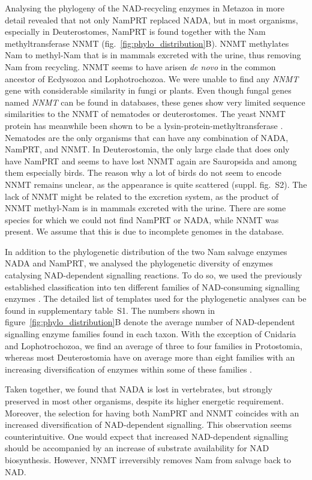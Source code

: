 Analysing the phylogeny of the NAD-recycling enzymes in Metazoa in more detail revealed that not only NamPRT replaced NADA, but in most organisms, especially in Deuterostomes, NamPRT is found together with the Nam methyltransferase NNMT (fig.~\ref{fig:phylo_distribution}B). NNMT methylates Nam to methyl-Nam that is in mammals excreted with the urine, thus removing Nam from recycling. NNMT seems to have arisen \textit{de novo} in the common ancestor of Ecdysozoa and Lophotrochozoa. We were unable to find any \textit{NNMT} gene with considerable similarity in fungi or plants. Even though fungal genes named \textit{NNMT} can be found in databases, these genes show very limited sequence similarities to the NNMT of nematodes or deuterostomes. The yeast NNMT protein has meanwhile been shown to be a lysin-protein-methyltransferase \cite{Wlodarski2011}. Nematodes are the only organisms that can have any combination of NADA, NamPRT, and NNMT. In Deuterostomia, the only large clade that does only have NamPRT and seems to have lost NNMT again are Sauropsida and among them especially birds. The reason why a lot of birds do not seem to encode NNMT remains unclear, as the appearance is quite scattered (suppl. fig.~S2). The lack of NNMT might be related to the excretion system, as the product of NNMT methyl-Nam is in mammals excreted with the urine. There are some species for which we could not find NamPRT or NADA, while NNMT was present. We assume that this is due to incomplete genomes in the database.

In addition to the phylogenetic distribution of the two Nam salvage enzymes NADA and NamPRT, we analysed the phylogenetic diversity of enzymes catalysing NAD-dependent signalling reactions. To do so, we used the previously established classification into ten different families of NAD-consuming signalling enzymes \cite{Gossmann2012FEBS}. The detailed list of templates used for the phylogenetic analyses can be found in supplementary table~S1. The numbers shown in figure~\ref{fig:phylo_distribution}B denote the average number of NAD-dependent signalling enzyme families found in each taxon. With the exception of Cnidaria and Lophotrochozoa, we find an average of three to four families in Protostomia, whereas most Deuterostomia have on average more than eight families with an increasing diversification of enzymes within some of these families \cite{Gossmann2014DNAR}.

Taken together, we found that NADA is lost in vertebrates, but strongly preserved in most other organisms, despite its higher energetic requirement. Moreover, the selection for having both NamPRT and NNMT coincides with an increased diversification of NAD-dependent signalling. This observation seems counterintuitive. One would expect that increased NAD-dependent signalling should be accompanied by an increase of substrate availability for NAD biosynthesis. However, NNMT irreversibly removes Nam from salvage back to NAD.


